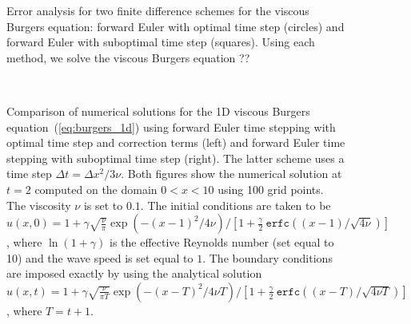 \documentclass[oneeqnum,onefignum,onetabnum,onethmnum]{siamltex}
\begin{document}
\begin{figure}[htb]
\begin{center}
\caption{Error analysis for two finite difference schemes for the 
viscous Burgers equation: forward Euler with optimal time step (circles)
and forward Euler with suboptimal time step (squares).
Using each method, we solve the viscous Burgers equation ??
}
\label{fig:burgers_1d_error}
\end{center}
\end{figure}

\begin{figure}[htb]
\begin{center}
\ \ \ \ \ 
\caption{Comparison of numerical solutions for the 1D viscous Burgers 
equation~(\ref{eq:burgers_1d}) using forward Euler time stepping with 
optimal time step and correction terms (left) and forward Euler time 
stepping with suboptimal time step (right).  The latter scheme uses a 
time step $\Delta t = \Delta x^2 / 3 \nu$.  Both figures show the numerical
solution at $t = 2$ computed on the domain $0 < x < 10$ using 100 grid points.
The viscosity $\nu$ is set to $0.1$.  The initial conditions are taken to be 
$u(x,0) = 1 + \gamma \sqrt{\frac{\nu}{\pi}} \exp\left( -(x-1)^2/4 \nu \right) 
            / \left[ 1 + \frac{\gamma}{2} \ 
                         \mathtt{erfc}\left((x-1)/\sqrt{4\nu} \right) 
    \right]$,
where $\ln(1+\gamma)$ is the effective Reynolds number (set equal to 10) and 
the wave speed is set equal to $1$.  The boundary conditions are imposed 
exactly by using
the analytical solution
$u(x,t) = 1 + \gamma \sqrt{\frac{\nu}{\pi T}} 
              \exp\left( -(x-T)^2/4 \nu T \right) 
            / \left[ 1 + \frac{\gamma}{2} \ 
                         \mathtt{erfc}\left((x-T)/\sqrt{4\nu T} \right) 
    \right]$,
where $T = t+1$.
}
\label{fig:burgers_1d_solns}
\end{center}
\end{figure}
\end{document}
